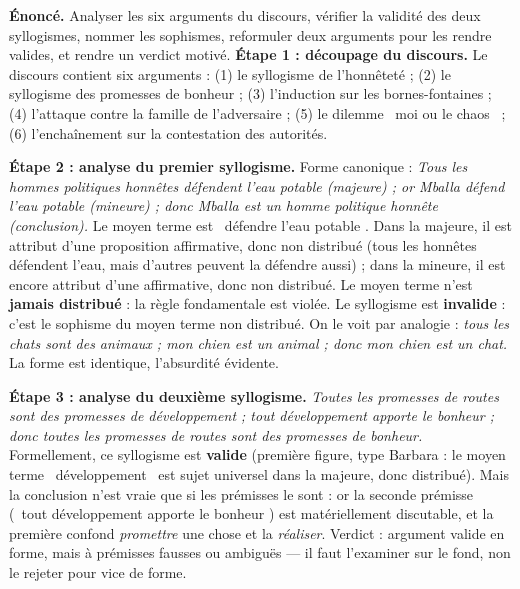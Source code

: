\documentclass[11pt]{article}
\newcommand{\cle}[1]{{\popxbold\color{popdark}#1}}
\begin{document}
\begin{exoresolu}
\textbf{Énoncé.} Analyser les six arguments du discours, vérifier la validité des deux syllogismes, nommer les sophismes, reformuler deux arguments pour les rendre valides, et rendre un verdict motivé.
\tcblower
\textbf{Étape 1 : découpage du discours.} Le discours contient six arguments : (1) le syllogisme de l'honnêteté ; (2) le syllogisme des promesses de bonheur ; (3) l'induction sur les bornes-fontaines ; (4) l'attaque contre la famille de l'adversaire ; (5) le dilemme \guillemotleft\ moi ou le chaos \guillemotright\ ; (6) l'enchaînement sur la contestation des autorités.

\textbf{Étape 2 : analyse du premier syllogisme.} Forme canonique : \emph{Tous les hommes politiques honnêtes défendent l'eau potable (majeure) ; or Mballa défend l'eau potable (mineure) ; donc Mballa est un homme politique honnête (conclusion).} Le moyen terme est \guillemotleft\ défendre l'eau potable \guillemotright. Dans la majeure, il est attribut d'une proposition affirmative, donc non distribué (tous les honnêtes défendent l'eau, mais d'autres peuvent la défendre aussi) ; dans la mineure, il est encore attribut d'une affirmative, donc non distribué. Le moyen terme n'est \textbf{jamais distribué} : la règle fondamentale est violée. Le syllogisme est \textbf{invalide} : c'est le sophisme du \cle{moyen terme non distribué}. On le voit par analogie : \emph{tous les chats sont des animaux ; mon chien est un animal ; donc mon chien est un chat.} La forme est identique, l'absurdité évidente.

\textbf{Étape 3 : analyse du deuxième syllogisme.} \emph{Toutes les promesses de routes sont des promesses de développement ; tout développement apporte le bonheur ; donc toutes les promesses de routes sont des promesses de bonheur.} Formellement, ce syllogisme est \textbf{valide} (première figure, type Barbara : le moyen terme \guillemotleft\ développement \guillemotright\ est sujet universel dans la majeure, donc distribué). Mais la conclusion n'est vraie que si les prémisses le sont : or la seconde prémisse (\guillemotleft\ tout développement apporte le bonheur \guillemotright) est matériellement discutable, et la première confond \emph{promettre} une chose et la \emph{réaliser}. Verdict : argument valide en forme, mais à prémisses fausses ou ambiguës — il faut l'examiner sur le fond, non le rejeter pour vice de forme.


\end{exoresolu}
\end{document}
